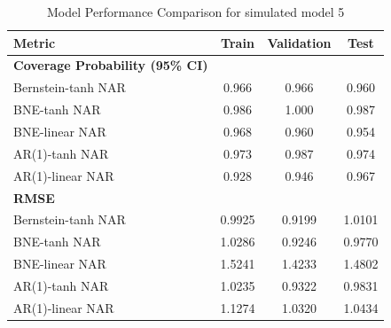 \documentclass{article}
\begin{document}
\begin{table}[htbp]
\centering
\caption{Model Performance Comparison for simulated model 5}
\label{tab:model5_test_ber}
\begin{tabular}{lccc}
\toprule
\textbf{Metric} & \textbf{Train} & \textbf{Validation} & \textbf{Test} \\
\midrule
\textbf{Coverage Probability (95\% CI)} & & & \\
Bernstein-tanh NAR & 0.966 & 0.966 & 0.960 \\
BNE-tanh NAR & 0.986 & 1.000 & 0.987 \\
BNE-linear NAR & 0.968 & 0.960 & 0.954 \\
AR(1)-tanh NAR & 0.973 & 0.987 & 0.974 \\
AR(1)-linear NAR & 0.928 & 0.946 & 0.967 \\
\midrule
\textbf{RMSE} & & & \\
Bernstein-tanh NAR & 0.9925 & 0.9199 & 1.0101 \\
BNE-tanh NAR & 1.0286 & 0.9246 & 0.9770 \\
BNE-linear NAR & 1.5241 & 1.4233 & 1.4802 \\
AR(1)-tanh NAR & 1.0235 & 0.9322 & 0.9831 \\
AR(1)-linear NAR & 1.1274 & 1.0320 & 1.0434 \\
\bottomrule
\end{tabular}
\end{table}



\newpage
\end{document}

